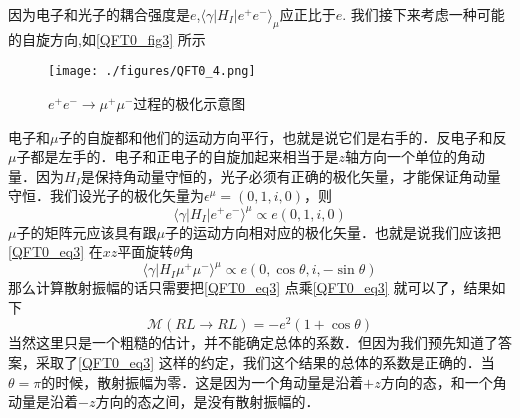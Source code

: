 因为电子和光子的耦合强度是$e$,$\langle \gamma | H_I | e^+ e^- \rangle_\mu$应正比于$e$. 我们接下来考虑一种可能的自旋方向,如\autoref{QFT0_fig3} 所示
\begin{figure}[ht]
\centering
\texttt{[image: ./figures/QFT0\_4.png]}
\caption{$e^+e^-\rightarrow\mu^+\mu^-$过程的极化示意图} \label{QFT0_fig3}
\end{figure}
电子和$\mu$子的自旋都和他们的运动方向平行，也就是说它们是右手的．反电子和反$\mu$子都是左手的．电子和正电子的自旋加起来相当于是$z$轴方向一个单位的角动量．因为$H_I$是保持角动量守恒的，光子必须有正确的极化矢量，才能保证角动量守恒．我们设光子的极化矢量为$\epsilon^\mu =(0,1,i,0)$，则
\begin{equation}
\langle \gamma | H_I | e^+ e^- \rangle^\mu \propto e (0,1,i ,0)
\end{equation}
$\mu$子的矩阵元应该具有跟$\mu$子的运动方向相对应的极化矢量．也就是说我们应该把\autoref{QFT0_eq3} 在$xz$平面旋转$\theta$角
\begin{equation}
\langle \gamma| H_I \mu^+\mu^-\rangle^\mu \propto e (0,\cos\theta, i, - \sin\theta) 
\end{equation}
那么计算散射振幅的话只需要把\autoref{QFT0_eq3} 点乘\autoref{QFT0_eq3} 就可以了，结果如下
\begin{equation}
\mathcal M(RL\rightarrow RL) = - e^2 (1+\cos\theta)
\end{equation}
当然这里只是一个粗糙的估计，并不能确定总体的系数．但因为我们预先知道了答案，采取了\autoref{QFT0_eq3} 这样的约定，我们这个结果的总体的系数是正确的．当$\theta = \pi$的时候，散射振幅为零．这是因为一个角动量是沿着$+z$方向的态，和一个角动量是沿着$-z$方向的态之间，是没有散射振幅的．


